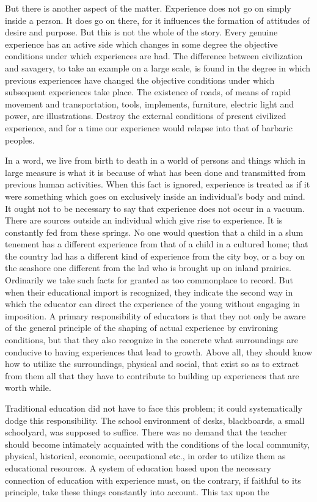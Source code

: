But there is another aspect of the matter. Experience does not go on simply inside a 
person. It does go on there, for it influences the formation of attitudes of desire and 
purpose. But this is not the whole of the story. Every genuine experience has an active 
side which changes in some degree the objective conditions under which experiences are 
had. The difference between civilization and savagery, to take an example on a large 
scale, is found in the degree in which previous experiences have changed the objective 
conditions under which subsequent experiences take place. The existence of roads, of 
means of rapid movement and transportation, tools, implements, furniture, electric light 
and power, are illustrations. Destroy the external conditions of present civilized 
experience, and for a time our experience would relapse into that of barbaric peoples. 

In a word, we live from birth to death in a world of persons and things which in large 
measure is what it is because of what has been done and transmitted from previous 
human activities. When this fact is ignored, experience is treated as if it were something 
which goes on exclusively inside an individual's body and mind. It ought not to be 
necessary to say that experience does not occur in a vacuum. There are sources outside an 
individual which give rise to experience. It is constantly fed from these springs. No one 
would question that a child in a slum tenement has a different experience from that of a 
child in a cultured home; that the country lad has a different kind of experience from the 
city boy, or a boy on the seashore one different from the lad who is brought up on inland 
prairies. Ordinarily we take such facts for granted as too commonplace to record. But 
when their educational import is recognized, they indicate the second way in which the 
educator can direct the experience of the young without engaging in imposition. A 
primary responsibility of educators is that they not only be aware of the general principle 
of the shaping of actual experience by environing conditions, but that they also recognize 
in the concrete what surroundings are conducive to having experiences that lead to 
growth. Above all, they should know how to utilize the surroundings, physical and social, 
that exist so as to extract from them all that they have to contribute to building up 
experiences that are worth while. 

Traditional education did not have to face this problem; it could systematically dodge 
this responsibility. The school environment of desks, blackboards, a small schoolyard, 
was supposed to suffice. There was no demand that the teacher should become intimately 
acquainted with the conditions of the local community, physical, historical, economic, 
occupational etc., in order to utilize them as educational resources. A system of education 
based upon the necessary connection of education with experience must, on the contrary, 
if faithful to its principle, take these things constantly into account. This tax upon the 



